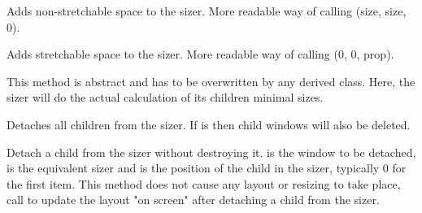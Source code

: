 

\label{wxsizeraddspacer}


Adds non-stretchable space to the sizer. More readable way of calling
(size, size, 0).


\label{wxsizeraddstretchspacer}


Adds stretchable space to the sizer. More readable way of calling
(0, 0, prop).


\label{wxsizercalcmin}


This method is abstract and has to be overwritten by any derived class.
Here, the sizer will do the actual calculation of its children minimal sizes.


\label{wxsizerclear}


Detaches all children from the sizer. If  is \true then child windows will also be deleted.


\label{wxsizerdetach}




Detach a child from the sizer without destroying it.  is the window to be
detached,  is the equivalent sizer and  is the position of
the child in the sizer, typically 0 for the first item. This method does not
cause any layout or resizing to take place, call 
to update the layout "on screen" after detaching a child from the sizer.

